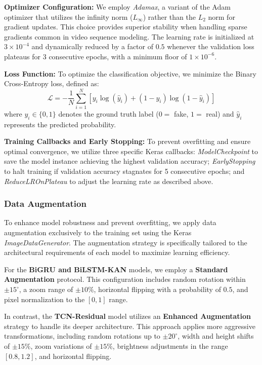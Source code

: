 \documentclass[conference]{IEEEtran}
\begin{document}
\textbf{Optimizer Configuration:} We employ \textit{Adamax}, a variant of the Adam optimizer that utilizes the infinity norm ($L_\infty$) rather than the $L_2$ norm for gradient updates. This choice provides superior stability when handling sparse gradients common in video sequence modeling. The learning rate is initialized at $3 \times 10^{-4}$ and dynamically reduced by a factor of $0.5$ whenever the validation loss plateaus for 3 consecutive epochs, with a minimum floor of $1 \times 10^{-6}$.

\textbf{Loss Function:} To optimize the classification objective, we minimize the Binary Cross-Entropy loss, defined as:
\begin{equation}
    \mathcal{L} = -\frac{1}{N}\sum_{i=1}^{N} [y_i \log(\hat{y}_i) + (1-y_i)\log(1-\hat{y}_i)]
\end{equation}
where $y_i \in \{0,1\}$ denotes the ground truth label ($0=$ fake, $1=$ real) and $\hat{y}_i$ represents the predicted probability.

\textbf{Training Callbacks and Early Stopping:} To prevent overfitting and ensure optimal convergence, we utilize three specific Keras callbacks: \textit{ModelCheckpoint} to save the model instance achieving the highest validation accuracy; \textit{EarlyStopping} to halt training if validation accuracy stagnates for 5 consecutive epochs; and \textit{ReduceLROnPlateau} to adjust the learning rate as described above.

\subsubsection{Data Augmentation}
\mbox{}

To enhance model robustness and prevent overfitting, we apply data augmentation exclusively to the training set using the Keras \textit{ImageDataGenerator}. The augmentation strategy is specifically tailored to the architectural requirements of each model to maximize learning efficiency.

For the \textbf{BiGRU and BiLSTM-KAN} models, we employ a \textbf{Standard Augmentation} protocol. This configuration includes random rotation within $\pm 15^{\circ}$, a zoom range of $\pm 10\%$, horizontal flipping with a probability of $0.5$, and pixel normalization to the $[0, 1]$ range.

In contrast, the \textbf{TCN-Residual} model utilizes an \textbf{Enhanced Augmentation} strategy to handle its deeper architecture. This approach applies more aggressive transformations, including random rotations up to $\pm 20^{\circ}$, width and height shifts of $\pm 15\%$, zoom variations of $\pm 15\%$, brightness adjustments in the range $[0.8, 1.2]$, and horizontal flipping.
\end{document}
